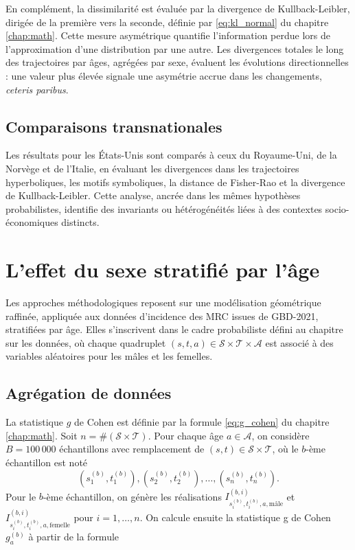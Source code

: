 En complément, la dissimilarité est évaluée par la divergence de Kullback-Leibler, dirigée de la première vers la seconde, définie par \eqref{eq:kl_normal} du chapitre \ref{chap:math}. Cette mesure asymétrique quantifie l'information perdue lors de l'approximation d'une distribution par une autre. Les divergences totales le long des trajectoires par âges, agrégées par sexe, évaluent les évolutions directionnelles : une valeur plus élevée signale une asymétrie accrue dans les changements, \emph{ceteris paribus}.

\subsection{Comparaisons transnationales}

Les résultats pour les États-Unis sont comparés à ceux du Royaume-Uni, de la Norvège et de l'Italie, en évaluant les divergences dans les trajectoires hyperboliques, les motifs symboliques, la distance de Fisher-Rao et la divergence de Kullback-Leibler. Cette analyse, ancrée dans les mêmes hypothèses probabilistes, identifie des invariants ou hétérogénéités liées à des contextes socio-économiques distincts.

\section{L'effet du sexe stratifié par l'âge}

Les approches méthodologiques reposent sur une modélisation géométrique raffinée, appliquée aux données d'incidence des MRC issues de GBD-2021, stratifiées par âge. Elles s'inscrivent dans le cadre probabiliste défini au chapitre sur les données, où chaque quadruplet $(s,t,a) \in \mathcal{S} \times \mathcal{T} \times \mathcal{A}$ est associé à des variables aléatoires pour les mâles et les femelles.

\subsection{Agrégation de données}

La statistique $g$ de Cohen est définie par la formule \eqref{eq:g_cohen} du chapitre \ref{chap:math}. Soit $n = \# (\mathcal{S} \times \mathcal{T})$. Pour chaque âge $a \in \mathcal{A}$, on considère $B = 100\,000$ échantillons avec remplacement de $(s,t) \in \mathcal{S} \times \mathcal{T}$, où le $b$-ème échantillon est noté
\begin{equation}
(s_1^{(b)}, t_1^{(b)}), (s_2^{(b)}, t_2^{(b)}), \dots, (s_n^{(b)}, t_n^{(b)}).
\end{equation}
Pour le $b$-ème échantillon, on génère les réalisations $I_{s_i^{(b)}, t_i^{(b)}, a, \mathrm{mâle}}^{(b,i)}$ et $I_{s_i^{(b)}, t_i^{(b)}, a, \mathrm{femelle}}^{(b,i)}$ pour $i = 1, \dots, n$. On calcule ensuite la statistique g de Cohen $g_a^{(b)}$ à partir de la formule 

